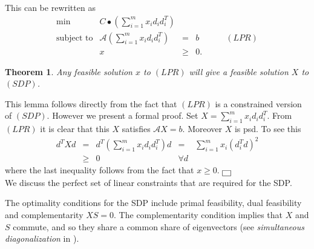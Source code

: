 \documentclass[12pt]{kluwer}
\newtheorem{theorem}{Theorem}
\newenvironment{proof}{{\raggedright\bf
 Proof:}\quad}{\hspace*{\fill}$\fbox{ }$\\}
\begin{document}
\begin{article}
This can be rewritten as
\begin{displaymath}
\begin{array}{lrclr}
\min & C \bullet (\sum_{i=1}^m x_i d_i d_i^T)  \\
\mbox{subject to} & \mathcal{A} (\sum_{i=1}^m x_i d_i d_i^T) & = & b & \qquad (LPR)  \\
& x & \geq & 0.
\end{array}
\end{displaymath}
\begin{theorem}
\label{const_vers}
Any feasible solution $x$ to $(LPR)$ will give a feasible solution $X$ to $(SDP)$.
\end{theorem}
\begin{proof}
This lemma follows directly from the fact that $(LPR)$ is a constrained version of $(SDP)$. However
we present a formal proof.
Set $X=\sum_{i=1}^m x_i d_id_i^T$. From $(LPR)$ it is clear that this $X$ satisfies $\mathcal{A}X=b$.
Moreover $X$ is psd. To see this
\begin{displaymath}
\begin{array}{ccccc}
d^TXd & = & d^T(\sum_{i=1}^m x_id_id_i^T)d & = & \sum_{i=1}^m x_i(d_i^Td)^2 \\
& \ge & 0 & \forall d
\end{array}
\end{displaymath}
where the last inequality follows from the fact that $x \ge 0$.
\end{proof}
We discuss the perfect set of linear constraints that are required for the SDP.

The optimality conditions for the SDP include primal feasibility, dual feasibility and complementarity
$XS = 0$. The complementarity condition implies that $X$ and $S$ commute, and so they share a common
share of eigenvectors (see {\em simultaneous diagonalization} in
).


\end{article}
\end{document}
